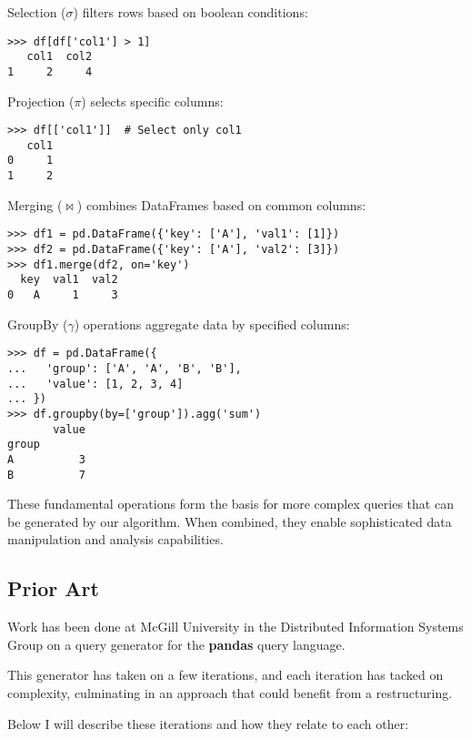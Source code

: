 \documentclass[10pt, twocolumn]{article}
\begin{document}
\spacing
\noindent
Selection ($\sigma$) filters rows based on boolean conditions:

\begin{verbatim}
>>> df[df['col1'] > 1]
   col1  col2
1     2     4
\end{verbatim}

\noindent
Projection ($\pi$) selects specific columns:

\begin{verbatim}
>>> df[['col1']]  # Select only col1
   col1
0     1
1     2
\end{verbatim}

\noindent
Merging ($\bowtie$) combines DataFrames based on common columns:

\begin{verbatim}
>>> df1 = pd.DataFrame({'key': ['A'], 'val1': [1]})
>>> df2 = pd.DataFrame({'key': ['A'], 'val2': [3]})
>>> df1.merge(df2, on='key')
  key  val1  val2
0   A     1     3
\end{verbatim}

\noindent
GroupBy ($\gamma$) operations aggregate data by specified columns:

\begin{verbatim}
>>> df = pd.DataFrame({
...   'group': ['A', 'A', 'B', 'B'],
...   'value': [1, 2, 3, 4]
... })
>>> df.groupby(by=['group']).agg('sum')
       value
group
A          3
B          7
\end{verbatim}

\noindent
These fundamental operations form the basis for more complex queries that can be generated by our algorithm. When combined, they enable sophisticated data manipulation and analysis capabilities.

\subsection*{Prior Art}

Work has been done at McGill University in the Distributed Information Systems Group on a query generator for the \textbf{pandas} query language.

\spacing
\noindent
This generator has taken on a few iterations, and each iteration has tacked on complexity, culminating in
an approach that could benefit from a restructuring.

\spacing
\noindent
Below I will describe these iterations and how they relate to each other:
\end{document}
